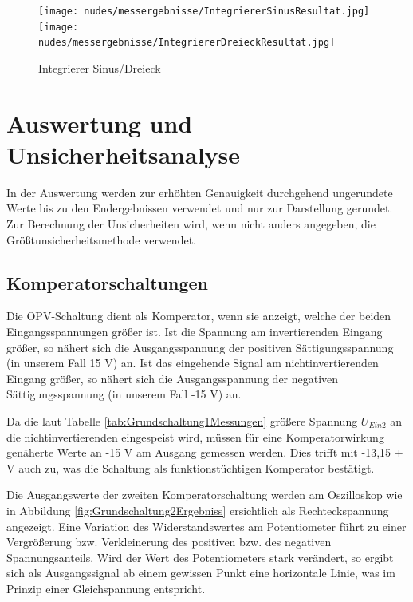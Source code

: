\documentclass[12pt,a4paper,twoside]{article}
\begin{document}
\begin{figure}[H]
    \centering
    \texttt{[image: nudes/messergebnisse/IntegriererSinusResultat.jpg]}
    \texttt{[image: nudes/messergebnisse/IntegriererDreieckResultat.jpg]}
    \caption{Integrierer Sinus/Dreieck}
    \label{fig:IntegriererResultat3}
\end{figure}


\section{Auswertung und Unsicherheitsanalyse} %

In der Auswertung werden zur erhöhten Genauigkeit durchgehend ungerundete Werte bis zu den Endergebnissen verwendet und nur zur Darstellung gerundet. \\
Zur Berechnung der Unsicherheiten wird, wenn nicht anders angegeben, die Größtunsicherheitsmethode verwendet.

\subsection{Komperatorschaltungen}

Die OPV-Schaltung dient als Komperator, wenn sie anzeigt, welche der beiden Eingangsspannungen größer ist. Ist die Spannung am invertierenden Eingang größer, so nähert sich die Ausgangsspannung der positiven Sättigungsspannung (in unserem Fall 15 V) an. 
Ist das eingehende Signal am nichtinvertierenden Eingang größer, so nähert sich die Ausgangsspannung der negativen Sättigungsspannung (in unserem Fall -15 V) an. \newline

\noindent
Da die laut Tabelle \ref{tab:Grundschaltung1Messungen} größere Spannung $U_{Ein2}$ an die nichtinvertierenden eingespeist wird, müssen für eine Komperatorwirkung genäherte Werte an -15 V am Ausgang gemessen werden. Dies trifft mit -13,15 $\pm$  V auch zu, was die Schaltung als funktionstüchtigen Komperator bestätigt. \newline

\noindent
Die Ausgangswerte der zweiten Komperatorschaltung werden am Oszilloskop wie in Abbildung \ref{fig:Grundschaltung2Ergebniss} ersichtlich als Rechteckspannung angezeigt. 
Eine Variation des Widerstandswertes am Potentiometer führt zu einer Vergrößerung bzw. Verkleinerung des positiven bzw. des negativen Spannungsanteils. Wird der Wert des Potentiometers stark verändert, so ergibt sich als Ausgangssignal ab einem gewissen Punkt eine horizontale Linie, was im Prinzip einer Gleichspannung entspricht. 
\end{document}
